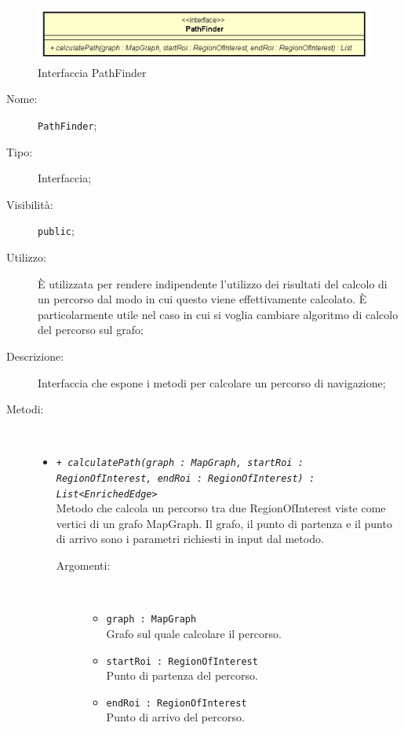 \documentclass[../DefinizioneDiProdotto.tex]{subfiles}
\begin{document}
    \begin{figure}[H]
        \centering
        \includegraphics{img/PathFinder.png}
        \caption{Interfaccia PathFinder}\label{fig:model::navigator::algorithm::PathFinder} 
    \end{figure}
    \begin{description}
\item[Nome:] \texttt{PathFinder};
\item[Tipo:] Interfaccia;
\item[Visibilità:] \texttt{public};
\item[Utilizzo:] È utilizzata per rendere indipendente l'utilizzo dei risultati del calcolo di un percorso dal modo in cui questo viene effettivamente calcolato. È particolarmente utile nel caso in cui si voglia cambiare algoritmo di calcolo del percorso sul grafo;
\item[Descrizione:] Interfaccia che espone i metodi per calcolare un percorso di navigazione;
\item[Metodi:] \
\begin{itemize}
\item \texttt{+ \textit{calculatePath(graph : MapGraph, startRoi : RegionOfInterest, endRoi : RegionOfInterest) : List<EnrichedEdge>}}\\
Metodo che calcola un percorso tra due RegionOfInterest viste come vertici di un grafo MapGraph. Il grafo, il punto di partenza e il punto di arrivo sono i parametri richiesti in input dal metodo.
 \begin{description}
\item[Argomenti:] \
\begin{itemize}
\item \texttt{graph : MapGraph}\\
Grafo sul quale calcolare il percorso.\item \texttt{startRoi : RegionOfInterest}\\
Punto di partenza del percorso.\item \texttt{endRoi : RegionOfInterest}\\
Punto di arrivo del percorso.\end{itemize}
\end{description}
\end{itemize}
\end{description}
\end{document}
